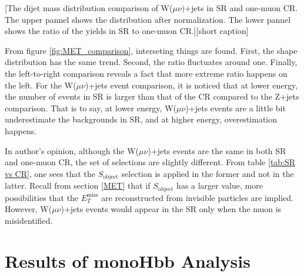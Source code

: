 \documentclass[class=NCU_thesis, crop=false]{standalone}
\begin{document}
		[The dijet mass distribution comparison of W($\mu \nu)$+jets in SR and one-muon CR. The upper pannel shows the distribution after normalization. The lower pannel shows the ratio of the yields in SR to one-muon CR.][short caption]
		
		From figure \ref{fig:MET_comparison}, interseting things are found. First, the shape distribution has the same trend. Second, the ratio fluctuates around one. Finally, the left-to-right comparison reveals a fact that more extreme ratio happens on the left. For the W($\mu \nu$)+jets event comparison, it is noticed that at lower energy, the number of events in SR is larger than that of the CR compared to the Z+jets comparison. That is to say, at lower energy, W($\mu \nu$)+jets events are a little bit underestimate the backgrounds in SR, and at higher energy, overestimation happens.
		
		In author's opinion, although the W($\mu \nu$)+jets events are the same in both SR and one-muon CR, the set of selections are slightly different. From table \ref{tab:SR vs CR}, one sees that the $S_{\mathrm{object}}$ selection is applied in the former and not in the latter. Recall from section \ref{MET} that if $S_{\mathrm{object}}$ has a larger value, more possibilities that the $E_T^{\mathrm{miss}}$ are reconstructed from invisible particles are implied. However, W($\mu \nu$)+jets events would appear in the SR only when the muon is misidentified.
	
	


\chapter{Results of monoHbb Analysis}
\end{document}
